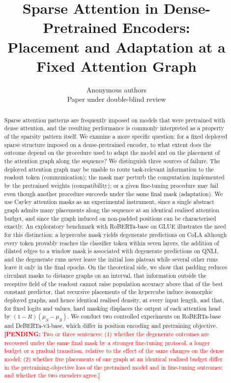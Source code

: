 \documentclass[10pt]{article}
\title{Sparse Attention in Dense-Pretrained Encoders:\\ Placement and Adaptation at a Fixed Attention Graph}
\author{\name Anonymous authors \\ \addr Paper under double-blind review}
\newcommand{\pending}[1]{\textcolor{red}{\textbf{[PENDING:} #1\textbf{]}}}
\begin{document}
\maketitle

\begin{abstract}
Sparse attention patterns are frequently imposed on models that were pretrained with dense attention, and the resulting performance is commonly interpreted as a property of the sparsity pattern itself. We examine a more specific question: for a fixed deployed sparse structure imposed on a dense-pretrained encoder, to what extent does the outcome depend on the procedure used to adapt the model and on the placement of the attention graph along the sequence? We distinguish three sources of failure. The deployed attention graph may be unable to route task-relevant information to the readout token (communication); the mask may perturb the computation implemented by the pretrained weights (compatibility); or a given fine-tuning procedure may fail even though another procedure succeeds under the same final mask (adaptation). We use Cayley attention masks as an experimental instrument, since a single abstract graph admits many placements along the sequence at an identical realised attention budget, and since the graph induced on non-padded positions can be characterised exactly. An exploratory benchmark with RoBERTa-base on GLUE illustrates the need for this distinction: a hypercube mask yields degenerate predictions on CoLA although every token provably reaches the classifier token within seven layers, the addition of dilated edges to a window mask is associated with degenerate predictions on QNLI, and the degenerate runs never leave the initial loss plateau while several other runs leave it only in the final epochs. On the theoretical side, we show that padding reduces circulant masks to distance graphs on an interval, that information outside the receptive field of the readout cannot raise population accuracy above that of the best constant predictor, that recursive placements of the hypercube induce isomorphic deployed graphs, and hence identical realised density, at every input length, and that, for fixed logits and values, hard masking displaces the output of each attention head by $(1-R)(\mu_S-\mu_{\bar S})$. We conduct two controlled experiments on RoBERTa-base and DeBERTa-v3-base, which differ in position encoding and pretraining objective. \pending{Two or three sentences: (1) whether the degenerate outcomes are recovered under the same final mask by a stronger fine-tuning protocol, a longer budget or a gradual transition, relative to the effect of the same changes on the dense model; (2) whether five placements of one graph at an identical realised budget differ in the pretraining-objective loss of the pretrained model and in fine-tuning outcomes; and whether the two encoders agree.}
\end{abstract}
\end{document}
